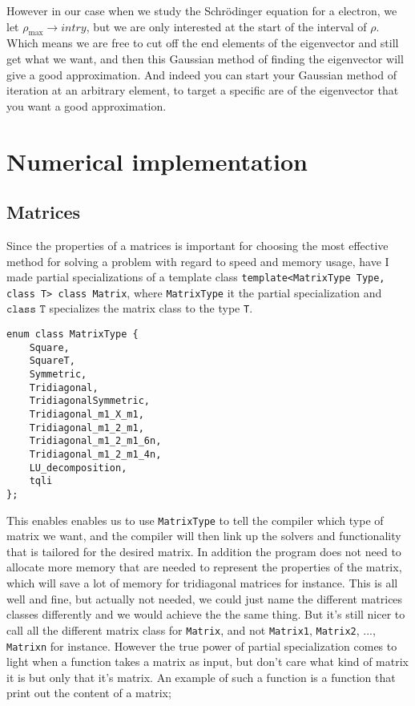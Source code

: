 \documentclass[11pt,english,a4paper]{article}
\begin{document}
\begin{flushleft}
However in our case when we study the Schr\"{o}dinger equation for a electron, we let $\rho_{\text{max}}\to intry$, but we are only interested at the start of the interval of $\rho$. Which means we are free to cut off the end elements of the eigenvector and still get what we want, and then this Gaussian method of finding the eigenvector will give a good approximation. And indeed you can start your Gaussian method of iteration at an arbitrary element, to target a specific are of the eigenvector that you want a good approximation.

\section{Numerical implementation}

\subsection{Matrices}

Since the properties of a matrices is important for choosing the most effective method for solving a problem with regard to speed and memory usage, have I made partial specializations of a template class \texttt{template<MatrixType Type, class T> class Matrix}, where \texttt{MatrixType} it the partial specialization and $\texttt{class T}$ specializes the matrix class to the type \texttt{T}.

\begin{lstlisting}[title={Matrix partial specialization}]
enum class MatrixType {
    Square,
    SquareT,
    Symmetric,
    Tridiagonal,
    TridiagonalSymmetric,
    Tridiagonal_m1_X_m1,
    Tridiagonal_m1_2_m1,
    Tridiagonal_m1_2_m1_6n,
    Tridiagonal_m1_2_m1_4n,
    LU_decomposition,
    tqli
};
\end{lstlisting}

This enables enables us to use \texttt{MatrixType} to tell the compiler which type of matrix we want, and the compiler will then link up the solvers and functionality that is tailored for the desired matrix. In addition the program does not need to allocate more memory that are needed to represent the properties of the matrix, which will save a lot of memory for tridiagonal matrices for instance. This is all well and fine, but actually not needed, we could just name the different matrices classes differently and we would achieve the the same thing. But it's still nicer to call all the different matrix class for \texttt{Matrix}, and not \texttt{Matrix1}, \texttt{Matrix2}, ..., \texttt{Matrixn} for instance. However the true power of partial specialization comes to light when a function takes a matrix as input, but don't care what kind of matrix it is but only that it's matrix. An example of such a function is a function that print out the content of a matrix;


\end{flushleft}
\end{document}

